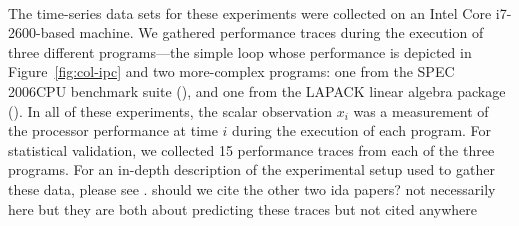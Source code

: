 The time-series data sets for these experiments were collected on an
Intel Core\textsuperscript{\textregistered} i7-2600-based machine.
% 
% 
We gathered performance traces during the execution of three different
programs---the simple \col loop whose performance is depicted in
Figure~\ref{fig:col-ipc} and two more-complex programs: one from the
SPEC 2006CPU benchmark suite (\gcc), and one from the LAPACK linear
algebra package (\svd).  In all of these experiments, the scalar
observation $x_i$ was a measurement of the processor performance at
time $i$ during the execution of each program.
% 
% 
% 
For statistical validation, we collected 15 performance traces from
each of the three programs.  For an in-depth description of the
experimental setup used to gather these data,
please see \cite{zach-IDA10,mytkowicz09,todd-phd}. \alert{should we cite the other two ida papers? not necessarily here but they are both about predicting these traces but not cited anywhere} 





